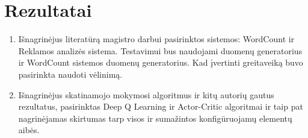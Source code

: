 \documentclass{VUMIFPSbakalaurinis}
\begin{document}
\section{Rezultatai}

\begin{enumerate}
    \item Išnagrinėjus literatūrą magistro darbui pasirinktos sistemos: WordCount ir Reklamos analizės sistema. Testavimui bus naudojami \cite{Chintapalli2016Benchmarking} duomenų generatorius ir WordCount sistemos duomenų generatorius. Kad įvertinti greitaveiką buvo pasirinkta naudoti vėlinimą.
    \item Išnagrinėjus skatinamojo mokymosi algoritmus ir kitų autorių gautus rezultatus, pasirinktas Deep Q Learning ir Actor-Critic algoritmai ir taip pat nagrinėjamas skirtumas tarp visos ir sumažintos konfigūruojamų elementų aibės.
\end{enumerate}

\printbibliography[heading=bibintoc] 
\end{document}
